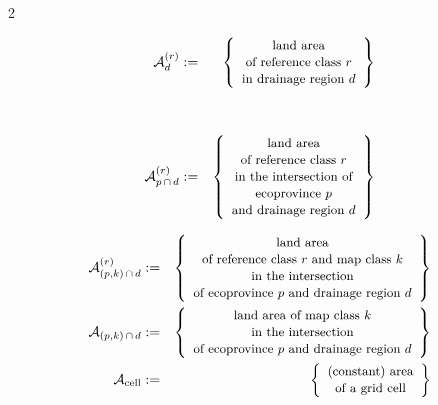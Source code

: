 \begin{multicols}{2}

	\begin{center}
	\begin{minipage}{3.25in}
	\begin{eqnarray*}
	\mathcal{A}^{(r)}_{d}
	& := &
		\left\{\begin{array}{c}
		\textnormal{\small land area}
		\\
		\textnormal{\small of reference class $r$}
		\\
		\textnormal{\small in drainage region $d$}
		\end{array}\right\}
	\\ \\ \\
	\mathcal{A}^{(r)}_{p\,\cap\,d}
	& := &
		\left\{\begin{array}{c}
		\textnormal{\small land area}
		\\
		\textnormal{\small of reference class $r$}
		\\
		\textnormal{\small in the intersection of}
		\\
		\textnormal{\small ecoprovince $p$}
		\\
		\textnormal{\small and drainage region $d$}
		\end{array}\right\}
	\end{eqnarray*}
	\end{minipage}
	\end{center}

\columnbreak

	\begin{center}
	\begin{minipage}{3.25in}
	\begin{eqnarray*}
	\mathcal{A}^{(r)}_{(p,k)\,\cap\,d}
	& := &
		\left\{\begin{array}{c}
		\textnormal{\small land area}
		\\
		\textnormal{\small of reference class $r$ and map class $k$}
		\\
		\textnormal{\small in the intersection}
		\\
		\textnormal{\small of ecoprovince $p$ and drainage region $d$}
		\end{array}\right\}
	\\
	\mathcal{A}_{(p,k)\,\cap\,d}
	& := &
		\left\{\begin{array}{c}
		\textnormal{\small land area of map class $k$}
		\\
		\textnormal{\small in the intersection}
		\\
		\textnormal{\small of ecoprovince $p$ and drainage region $d$}
		\end{array}\right\}
	\\
	\mathcal{A}_{\textnormal{cell}}
	& := &
		\left\{\begin{array}{c}
		\textnormal{\small (constant) area}
		\\
		\textnormal{\small of a grid cell}
		\end{array}\right\}
	\end{eqnarray*}
	\end{minipage}
	\end{center}

\end{multicols}
